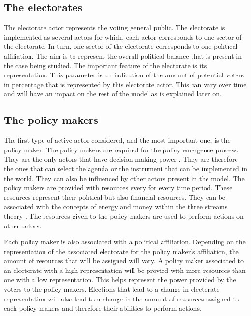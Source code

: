 \subsection{The electorates}

The electorate actor represents the voting general public. The electorate is implemented as several actors for which, each actor corresponds to one sector of the electorate. In turn, one sector of the electorate corresponds to one political affiliation. The aim is to represent the overall political balance that is present in the case being studied. The important feature of the electorate is its representation. This parameter is an indication of the amount of potential voters in percentage that is represented by this electorate actor. This can vary over time and will have an impact on the rest of the model as is explained later on.

\subsection{The policy makers}

The first type of active actor considered, and the most important one, is the policy maker. The policy makers are required for the policy emergence process. They are the only actors that have decision making power \citep{zahariadis2014ambiguity}. They are therefore the ones that can select the agenda or the instrument that can be implemented in the world. They can also be influenced by other actors present in the model. The policy makers are provided with resources every for every time period. These resources represent their political but also financial resources. They can be associated with the concepts of energy and money within the three streams theory \citep{zahariadis2014ambiguity}. The resources given to the policy makers are used to perform actions on other actors.

Each policy maker is also associated with a political affiliation. Depending on the representation of the associated electorate for the policy maker's affiliation, the amount of resources that will be assigned will vary. A policy maker associated to an electorate with a high representation will be provied with more resources than one with a low representation. This helps represent the power provided by the voters to the policy makers. Elections that lead to a change in electorate representation will also lead to a change in the amount of resources assigned to each policy makers and therefore their abilities to perform actions.

